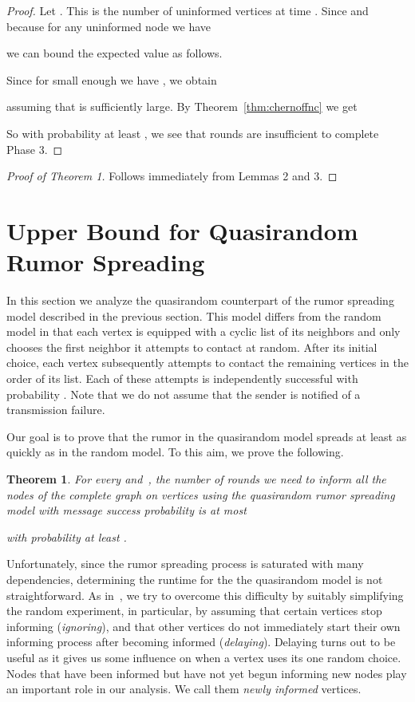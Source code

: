 \documentclass[12pt]{article}
\newtheorem{theorem}{Theorem}
\newcommand{\thmref}[1]{Theorem~\ref{thm:#1}}
\begin{document}
{\begin{proof}
Let . 
This is the number of uninformed vertices at time . 
Since  and because for any uninformed node  we have

we can bound the expected value as follows.

Since for small enough  we have , we obtain

assuming that  is sufficiently large.
By \thmref{chernoffnc} we get


So with probability at least , we see that  rounds are insufficient to complete Phase 3.
\end{proof}


\begin{proof}[Proof of Theorem 1]
 Follows immediately from Lemmas 2 and 3.
\end{proof}



\section{Upper Bound for Quasirandom Rumor Spreading}\label{sec:upper}

	
In this section we analyze the quasirandom counterpart of the rumor spreading model described in the previous section.
This model differs from the random model in that each vertex is equipped with a cyclic list of its neighbors and only chooses the first neighbor it attempts to contact at random. After its initial choice, each vertex subsequently attempts to contact the remaining vertices in the order of its list.
Each of these attempts is independently successful with probability . Note that we do not assume that the sender is notified of a transmission failure.

Our goal is to prove that the rumor in the quasirandom model spreads at least as quickly as in the random model. To this aim, we prove the following.

\begin{theorem}\label{thm:upper}
For every  and~, the number of rounds we need to inform all the nodes of the complete graph on  vertices using the quasirandom rumor spreading model with message success probability  is at most

with probability at least .
\end{theorem}

Unfortunately, since the rumor spreading process is saturated with many dependencies, determining the runtime for the the quasirandom model is not straightforward. As in~\cite{DFS08}, we try to overcome this difficulty by suitably simplifying the random experiment, in particular, by assuming that certain vertices stop informing (\emph{ignoring}), and that other vertices do not immediately start their own informing process after becoming informed (\emph{delaying}). 
Delaying turns out to be useful as it gives us some influence on when a vertex uses its one random choice. Nodes that have been informed but have not yet begun informing new nodes play an important role in our analysis. We call them \emph{newly informed} vertices.

}
\end{document}
